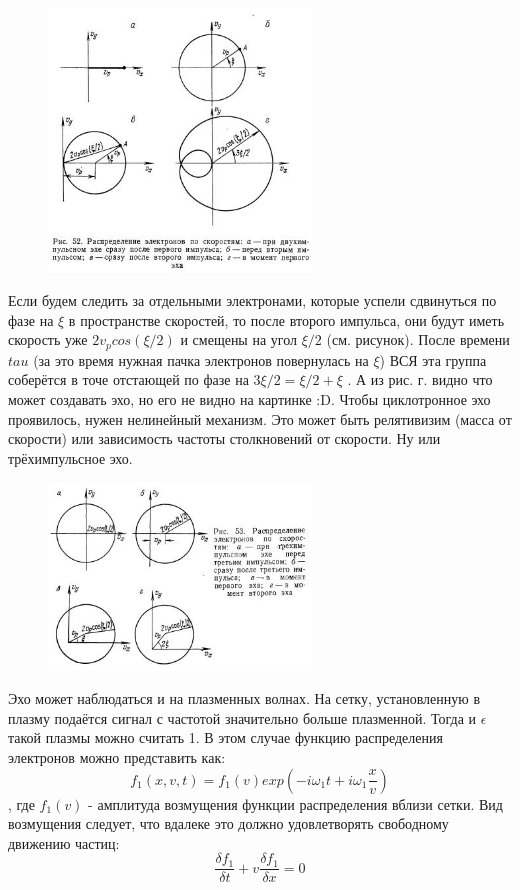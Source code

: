 \documentclass[10pt, a4paper]{article}
\begin{document}
\begin{figure}[ht]
	\begin{center}
		\includegraphics[width=70mm]{Echo_2_18.3.JPG}
	\end{center}
\end{figure}

Если будем следить за отдельными электронами, которые успели сдвинуться по фазе на $\xi$ в пространстве скоростей, то после второго импульса, они будут иметь скорость уже $2 v_p cos(\xi /2)$ и смещены на угол $\xi /2$ (см. рисунок). После времени $tau$ (за это время нужная пачка электронов повернулась на $\xi$) ВСЯ эта группа соберётся в точе отстающей по фазе на $3\xi/2 =\xi /2 + \xi $ .  А из рис. г. видно что может создавать эхо, но его не видно на картинке :D.
Чтобы циклотронное эхо проявилось, нужен нелинейный механизм. Это может быть релятивизим (масса от скорости) или зависимость частоты столкновений от скорости. Ну или трёхимпульсное эхо. 

\begin{figure}[ht]
	\begin{center}
		\includegraphics[width=70mm]{Echo_3_18.3.JPG}
	\end{center}
\end{figure}

Эхо может наблюдаться и на плазменных волнах.
На сетку, установленную в плазму подаётся сигнал с частотой значительно больше плазменной. Тогда и $\epsilon$ такой плазмы можно считать 1. В этом случае функцию распределения электронов можно представить как:
\begin{equation}
	f_1 (x,v,t)=f_1 (v) exp(-i \omega_1 t + i \omega_1 \frac{x}{v})
\end{equation}
, где  $f_1 (v)$ - амплитуда возмущения функции распределения вблизи сетки. Вид возмущения следует, что вдалеке это должно удовлетворять свободному движению частиц:
\begin{equation}
	\frac{\delta f_1}{\delta t} + v \frac{\delta f_1}{\delta x} =0
\end{equation}
\end{document}
